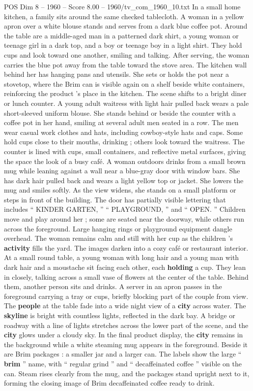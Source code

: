 \begin{textsample}{POS Dim 8 – 1960 – Score 8.00 – 1960/tv\_com\_1960\_10.txt}
In a small home kitchen, a family sits around the same checked tablecloth.
A woman in a yellow apron over a white blouse stands and serves from a dark blue coffee pot.
Around the table are a middle-aged man in a patterned dark shirt, a young woman or teenage girl in a dark top, and a boy or teenage boy in a light shirt.
They hold cups and look toward one another, smiling and talking.
After serving, the woman carries the blue pot away from the table toward the stove area.
The kitchen wall behind her has hanging pans and utensils.
She sets or holds the pot near a stovetop, where the Brim can is visible again on a shelf beside white containers, reinforcing the product ’s place in the kitchen.
The scene shifts to a bright diner or lunch counter.
A young adult waitress with light hair pulled back wears a pale short-sleeved uniform blouse.
She stands behind or beside the counter with a coffee pot in her hand, smiling at several adult men seated in a row.
The men wear casual work clothes and hats, including cowboy-style hats and caps.
Some hold cups close to their mouths, drinking ; others look toward the waitress.
The counter is lined with cups, small containers, and reflective metal surfaces, giving the space the look of a busy café.
A woman outdoors drinks from a small brown mug while leaning against a wall near a blue-gray door with window bars.
She has dark hair pulled back and wears a light yellow top or jacket.
She lowers the mug and smiles softly.
As the view widens, she stands on a small platform or steps in front of the building.
The door has partially visible lettering that includes “ KINDER GARTEN, ” “ PLAYGROUND, ” and “ OPEN. ” Children move and play around her ; some are seated near the doorway, while others run across the foreground.
Large hanging rings or playground equipment dangle overhead.
The woman remains calm and still with her cup as the children ’s \textbf{activity} fills the yard.
The images darken into a cozy café or restaurant interior.
At a small round table, a young woman with long hair and a young man with dark hair and a moustache sit facing each other, each \textbf{holding} a cup.
They lean in closely, talking across a small vase of flowers at the center of the table.
Behind them, another person sits and drinks.
A server in an apron passes in the foreground carrying a tray or cups, briefly blocking part of the couple from view.
The \textbf{people} at the table fade into a wide night view of a \textbf{city} across water.
The \textbf{skyline} is bright with countless lights, reflected in the dark bay.
A bridge or roadway with a line of lights stretches across the lower part of the scene, and the \textbf{city} glows under a cloudy sky.
In the final product display, the \textbf{city} remains in the background while a white steaming mug appears in the foreground.
Beside it are Brim packages : a smaller jar and a larger can.
The labels show the large “ \textbf{brim} ” name, with “ regular grind ” and “ decaffeinated coffee ” visible on the can.
Steam rises clearly from the mug, and the packages stand upright next to it, forming the closing image of Brim decaffeinated coffee ready to drink.

\end{textsample}
